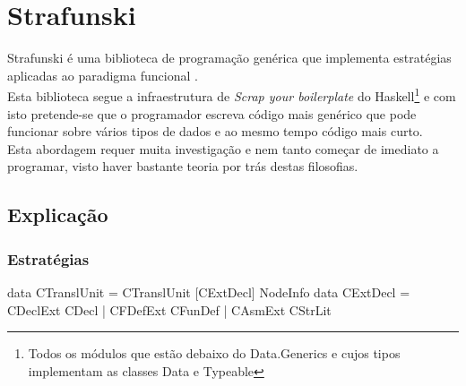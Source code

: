 \chapter{Strafunski}
\minitoc

Strafunski é uma biblioteca de programação genérica que implementa estratégias aplicadas ao paradigma funcional \cite{Lammel:2002:DPF:570186.570187,LV03-PADL}.\\
Esta biblioteca segue a infraestrutura de \textit{Scrap your boilerplate} \cite{SYB3} do
Haskell\footnote{Todos os módulos que estão debaixo do Data.Generics e cujos tipos implementam as classes Data e Typeable} e com isto pretende-se que o programador
escreva código mais genérico que pode funcionar sobre vários tipos de dados e ao mesmo tempo código mais curto.\\
Esta abordagem requer muita investigação e nem tanto começar de imediato a programar, visto haver bastante teoria por trás destas filosofias.

\section{Explicação}
\subsection{Estratégias}


\begin{haskell}
data CTranslUnit = CTranslUnit [CExtDecl] NodeInfo
data CExtDecl = CDeclExt CDecl
              | CFDefExt CFunDef
              | CAsmExt CStrLit
\end{haskell}

